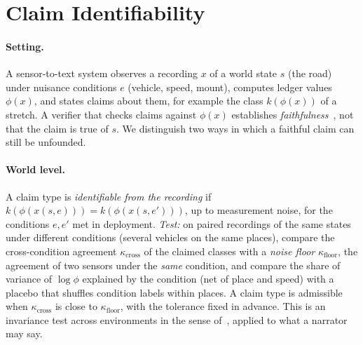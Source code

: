 \section{Claim Identifiability}
\label{sec:ident}

\paragraph{Setting.}
A sensor-to-text system observes a recording $x$ of a world state $s$ (the road) under nuisance conditions $e$ (vehicle, speed, mount), computes ledger values $\phi(x)$, and states claims about them, for example the class $k(\phi(x))$ of a stretch.
A verifier that checks claims against $\phi(x)$ establishes \emph{faithfulness}~\cite{maynez2020faithfulness}, not that the claim is true of $s$.
We distinguish two ways in which a faithful claim can still be unfounded.

\paragraph{World level.}
A claim type is \emph{identifiable from the recording} if $k(\phi(x(s,e)))=k(\phi(x(s,e')))$, up to measurement noise, for the conditions $e,e'$ met in deployment.
\emph{Test:} on paired recordings of the same states under different conditions (several vehicles on the same places), compare the cross-condition agreement $\kappa_{\text{cross}}$ of the claimed classes with a \emph{noise floor} $\kappa_{\text{floor}}$, the agreement of two sensors under the \emph{same} condition, and compare the share of variance of $\log\phi$ explained by the condition (net of place and speed) with a placebo that shuffles condition labels within places.
A claim type is admissible when $\kappa_{\text{cross}}$ is close to $\kappa_{\text{floor}}$, with the tolerance fixed in advance.
This is an invariance test across environments in the sense of~\cite{peters2016icp}, applied to what a narrator may say.

